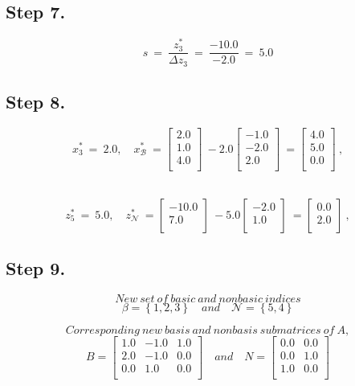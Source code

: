 \documentclass [12pt] {article}
\begin{document}
\subsection{Step 7.}
\[
s \ =\ \frac{z_{3}^{*}}{ \Delta z_{3}}\ =\ \frac{-10.0}{-2.0}\ =\ 5.0
\]
\subsection{Step 8.}
\[
x_{3}^{*}\ =\ 2.0, \quad x_{\mathcal B}^{*}\ =\begin{bmatrix}
2.0 \\ 1.0 \\ 4.0 \\ 
\end{bmatrix}\ -2.0\begin{bmatrix}
-1.0 \\ -2.0 \\ 2.0 \\ 
\end{bmatrix}\ =\begin{bmatrix}
4.0 \\ 5.0 \\ 0.0 \\ 
\end{bmatrix}\ ,
\]
\

\[
z_{5}^{*}\ =\ 5.0, \quad z_{\mathcal N}^{*}\ =\begin{bmatrix}
-10.0 \\ 7.0 \\ 
\end{bmatrix}\ -5.0\begin{bmatrix}
-2.0 \\ 1.0 \\ 
\end{bmatrix}\ =\begin{bmatrix}
0.0 \\ 2.0 \\ 
\end{bmatrix}\ ,
\]
\subsection{Step 9.}

\[ New\ set\  of\  basic\  and\  nonbasic\  indices \]
\[
\beta= \left\{1, 2, 3\right\} \quad and \quad  \mathcal{N}=\left\{5, 4\right\}
\]

\[
Corresponding\ new\ basis\ and\ nonbasis\ submatrices\ of\ A,
\]
\[
B =
\begin{bmatrix}
1.0 & -1.0 & 1.0 \\ 2.0 & -1.0 & 0.0 \\ 0.0 & 1.0 & 0.0 \\ 
\end{bmatrix} \quad and \quad
\mathit{N} =
\begin{bmatrix}
0.0 & 0.0 \\ 0.0 & 1.0 \\ 1.0 & 0.0 \\ 
\end{bmatrix}
\]
\end{document}
